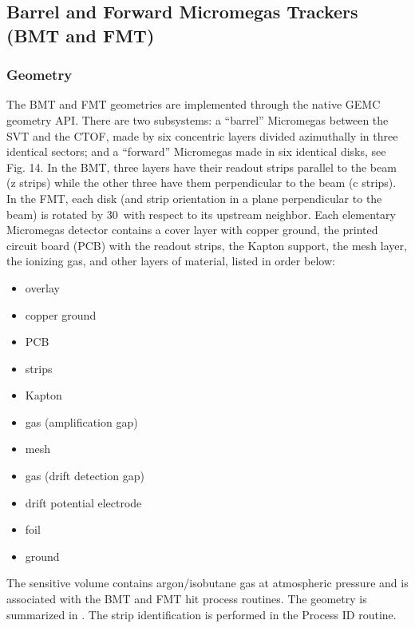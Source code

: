 \subsection{Barrel and Forward Micromegas Trackers (BMT and FMT)}

\subsubsection{Geometry}

The BMT and FMT geometries are implemented through the native GEMC geometry API.
There are two subsystems: a ``barrel'' Micromegas between the SVT and the CTOF, made by six concentric layers
divided azimuthally in three identical sectors; and a ``forward'' Micromegas
made in six identical disks, see Fig. 14. In the BMT, three layers have their readout strips parallel
to the beam (z strips) while the other three have them perpendicular to the
beam (c strips). In the FMT, each disk (and strip orientation in a plane perpendicular to the beam)
is rotated by 30\mdeg\ with respect to its upstream neighbor. Each elementary Micromegas detector contains a
cover layer with copper ground, the printed circuit board (PCB) with the readout strips,
the Kapton support, the mesh layer, the ionizing gas, and other layers of material, listed in order below:

\begin{itemize}
	\item overlay
	\item copper ground
	\item PCB
	\item strips
	\item Kapton
	\item gas (amplification gap)
	\item mesh
	\item gas (drift detection gap)
	\item drift potential electrode
	\item foil
	\item ground
\end{itemize}

The sensitive volume contains argon/isobutane gas at atmospheric pressure and is associated with the BMT and
FMT hit process routines.
The geometry is summarized in . The strip identification is performed in the Process ID routine.


